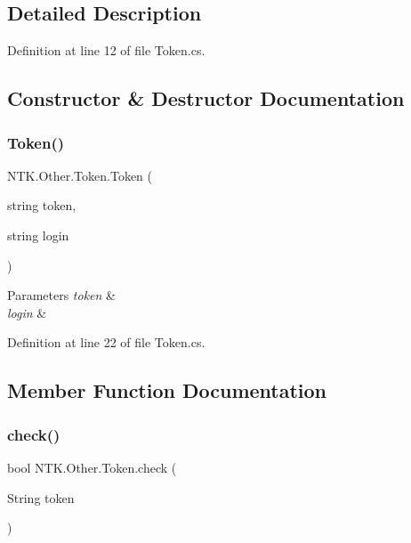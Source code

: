 \subsection{Detailed Description}




Definition at line 12 of file Token.\+cs.



\subsection{Constructor \& Destructor Documentation}
\mbox{\label{class_n_t_k_1_1_other_1_1_token_af301273341f9c562de715cb577dd94cb}} 
\subsubsection{\texorpdfstring{Token()}{Token()}}
{\footnotesize\ttfamily N\+T\+K.\+Other.\+Token.\+Token (\begin{DoxyParamCaption}\item[{string}]{token,  }\item[{string}]{login }\end{DoxyParamCaption})}






\begin{DoxyParams}{Parameters}
{\em token} & \\
\hline
{\em login} & \\
\hline
\end{DoxyParams}


Definition at line 22 of file Token.\+cs.



\subsection{Member Function Documentation}
\mbox{\label{class_n_t_k_1_1_other_1_1_token_aec2b62dbf00f5d33859c29db2e5ee054}} 
\subsubsection{\texorpdfstring{check()}{check()}}
{\footnotesize\ttfamily bool N\+T\+K.\+Other.\+Token.\+check (\begin{DoxyParamCaption}\item[{String}]{token }\end{DoxyParamCaption})}



